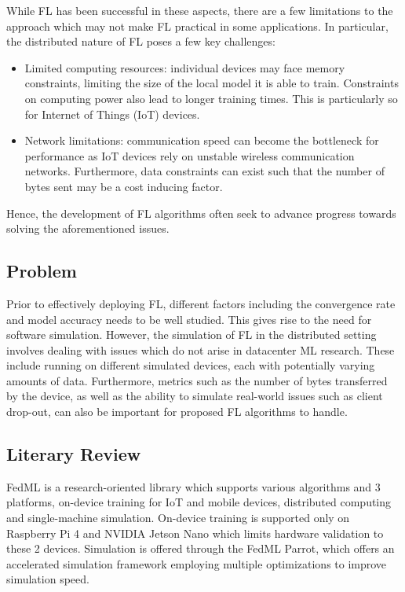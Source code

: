 \documentclass[12pt]{article}
\begin{document}
While FL has been successful in these aspects, there are a few limitations to the approach which may
not make FL practical in some applications. In particular, the distributed nature of FL
poses a few key challenges:

\begin{itemize}
  \item Limited computing resources: individual devices may face memory constraints, limiting the
    size of the local model it is able to train. Constraints on computing power also lead to
    longer training times. This is particularly so for Internet of Things (IoT) devices.
  \item Network limitations: communication speed can become the bottleneck for performance as IoT
    devices rely on unstable wireless communication networks. Furthermore, data constraints can
    exist such that the number of bytes sent may be a cost inducing factor.
\end{itemize}

Hence, the development of FL algorithms often seek to advance progress towards solving the
aforementioned issues.

\subsection{Problem}
Prior to effectively deploying FL, different factors including the convergence rate and
model accuracy needs to be well studied. This gives rise to the need for software simulation. However, the
simulation of FL in the distributed setting involves dealing with
issues which do not arise in datacenter ML research. These include running on different simulated
devices, each with potentially varying amounts of data. Furthermore, metrics such as the number of
bytes transferred by the device, as well as the ability to simulate real-world issues such as client
drop-out, can also be important for proposed FL algorithms to handle.

\subsection{Literary Review}
FedML\cite{he_2020_fedml} is a research-oriented library which supports various algorithms and 3 platforms, on-device training for IoT and
mobile devices, distributed computing and single-machine simulation. On-device training is supported
only on Raspberry Pi 4 and NVIDIA Jetson Nano which limits hardware validation to these 2 devices.
Simulation is offered through the FedML Parrot\cite{tang_2023_fedml}, which offers an accelerated simulation
framework employing multiple optimizations to improve simulation speed.\\
\end{document}

